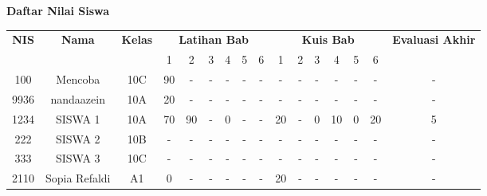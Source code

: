 \documentclass[a4paper,12pt]{article}
\begin{document}
\begin{landscape}
\begin{center}
{\Large \textbf{Daftar Nilai Siswa }}
\end{center}

\vspace{0.5cm}

\begin{longtable}{|c|c|c|*{6}{c}|*{6}{c}|c|}
\hline
\rowcolor{gray}
\textbf{NIS} & \textbf{Nama} & \textbf{Kelas} & \multicolumn{6}{c|}{\textbf{Latihan Bab}} & \multicolumn{6}{c|}{\textbf{Kuis Bab}} & \textbf{Evaluasi Akhir} \\
\cline{4-15}
\rowcolor{gray}
& & & 1 & 2 & 3 & 4 & 5 & 6 & 1 & 2 & 3 & 4 & 5 & 6 & \\
\hline
\endhead
100 & Mencoba & 10C & 90 & - & - & - & - & - & - & - & - & - & - & - & - \\ \hline
9936 & nandaazein & 10A & 20 & - & - & - & - & - & - & - & - & - & - & - & - \\ \hline
1234 & SISWA 1 & 10A & 70 & 90 & - & 0 & - & - & 20 & - & 0 & 10 & 0 & 20 & 5 \\ \hline
222 & SISWA 2 & 10B & - & - & - & - & - & - & - & - & - & - & - & - & - \\ \hline
333 & SISWA 3 & 10C & - & - & - & - & - & - & - & - & - & - & - & - & - \\ \hline
2110 & Sopia Refaldi & A1 & 0 & - & - & - & - & - & 20 & - & - & - & - & - & - \\ \hline

\end{longtable}
\end{landscape}
\end{document}
